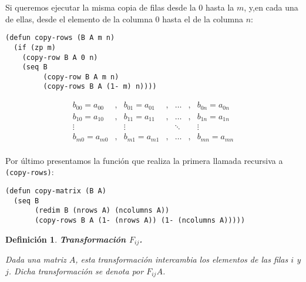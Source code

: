 \documentclass[a4paper,10pt]{article}
\newtheorem{defi}{{Definición}}
\begin{document}
Si queremos ejecutar la misma copia de filas desde la 0 hasta la $m$, y,en cada una de ellas, desde el elemento de la columna 0 hasta el de la columna $n$:

\par \vspace{10pt}

\begin{lstlisting}[language=clips]
(defun copy-rows (B A m n)
  (if (zp m)
    (copy-row B A 0 n)
    (seq B
         (copy-row B A m n)
         (copy-rows B A (1- m) n))))
\end{lstlisting}

\par \vspace{10pt}

$$
\begin{array}{ccccccccc}
b_{00} = a_{00} & , & b_{01} = a_{01} & , & \dots & , & b_{0n} = a_{0n} \\
b_{10} = a_{10} & , & b_{11} = a_{11} & , & \dots & , & b_{1n} = a_{1n} \\
\vdots & & \vdots & & \ddots & & \vdots\\
b_{m0} = a_{m0} & , & b_{m1} = a_{m1} & , & \dots & , & b_{mn} = a_{mn} \\
\end{array}
$$

\par \vspace{10pt}	

Por último presentamos la función que realiza la primera llamada recursiva a \texttt{(copy-rows)}:

\par \vspace{10pt}

\begin{lstlisting}[language=clips]
(defun copy-matrix (B A)
  (seq B
       (redim B (nrows A) (ncolumns A))
       (copy-rows B A (1- (nrows A)) (1- (ncolumns A)))))
\end{lstlisting}

\par \vspace{12pt}

\begin{defi} \textbf{Transformación $F_{ij}$.}\vspace{8pt}\par
Dada una matriz $A$, esta transformación intercambia los elementos de las filas $i$ y $j$. Dicha transformación se denota por $F_{ij}A$.
\end{defi}
\end{document}
